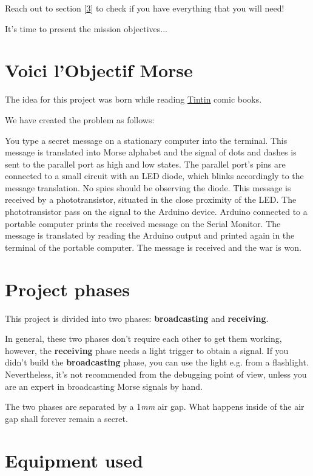 \documentclass[12pt]{report}
\begin{document}
Reach out to section [\ref{sec:equip}] to check if you have everything that you will need!

It's time to present the mission objectives...

\section{Voici l'Objectif Morse}

The idea for this project was born while reading \href{https://fr.wikipedia.org/wiki/Objectif_Lune}{Tintin} comic books. 

We have created the problem as follows:

You type a secret message on a stationary computer into the terminal. This message is translated into Morse alphabet and the signal of dots and dashes is sent to the parallel port as high and low states. The parallel port's pins are connected to a small circuit with an LED diode, which blinks accordingly to the message translation. No spies should be observing the diode. This message is received by a phototransistor, situated in the close proximity of the LED. The phototransistor pass on the signal to the Arduino device. Arduino connected to a portable computer prints the received message on the Serial Monitor. The message is translated by reading the Arduino output and printed again in the terminal of the portable computer. The message is received and the war is won.


\section{Project phases}

This project is divided into two phases: \textbf{broadcasting} and \textbf{receiving}. 

In general, these two phases don't require each other to get them working, however, the \textbf{receiving} phase needs a light trigger to obtain a signal. If you didn't build the  \textbf{broadcasting} phase, you can use the light e.g. from a flashlight. Nevertheless, it's not recommended from the debugging point of view, unless you are an expert in broadcasting Morse signals by hand.

The two phases are separated by a 1\textit{mm} air gap. What happens inside of the air gap shall forever remain a secret.


\section{Equipment used} \label{sec:equip}
\end{document}
